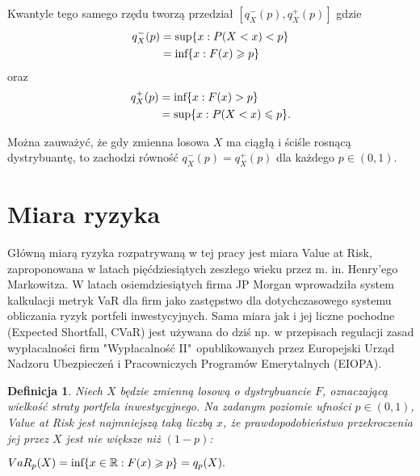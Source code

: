 \documentclass[12pt,a4paper,openany]{book}
\newtheorem{df}{Definicja}
\begin{document}
\noindent Kwantyle tego samego rzędu tworzą przedział $[q^{-}_{X}(p),q^{+}_{X}(p)]$ gdzie
\begin{gather}
\begin{split}
q^{-}_{X}(p) &=\textnormal{sup}\{x: P(X<x)<p\} \\ \nonumber
								 &=\textnormal{inf} \{x: F(x)\geqslant p \} \nonumber
\end{split}
\end{gather}
oraz\
\begin{gather}
\begin{split}
q^{+}_{X}(p) &=\textnormal{inf}\{x: F(x)>p\} \\ \nonumber
								 &=\textnormal{sup} \{x:  P(X<x) \leqslant p \}. \nonumber
\end{split}
\end{gather}

Można zauważyć, że gdy zmienna losowa $X$ ma ciągłą i ściśle rosnącą dystrybuantę, to zachodzi równość $q^{-}_{X}(p) = q^{+}_{X}(p)$ dla każdego $p \in (0,1)$.\\


\section{Miara ryzyka}

Główną miarą ryzyka rozpatrywaną w tej pracy jest miara Value at Risk, zaproponowana w latach pięćdziesiątych zeszłego wieku przez m. in. Henry'ego Markowitza. W latach osiemdziesiątych firma JP Morgan wprowadziła system kalkulacji metryk VaR dla firm jako zastępstwo dla dotychczasowego systemu obliczania ryzyk portfeli inwestycyjnych. Sama miara jak i jej liczne pochodne (Expected Shortfall, CVaR) jest używana do dziś np. w przepisach regulacji zasad wypłacalności firm "Wypłacalność II"$\phantom{c}$opublikowanych przez Europejski Urząd Nadzoru Ubezpieczeń i Pracowniczych Programów Emerytalnych (EIOPA).


\begin{df}
Niech $X$ będzie zmienną losową o dystrybuancie $F$, oznaczającą wielkość straty portfela inwestycyjnego. Na zadanym poziomie ufności $p \in (0,1)$, Value at Risk jest najmniejszą taką liczbą $x$, że prawdopodobieństwo przekroczenia jej przez $X$ jest nie większe niż $(1-p)$:

\begin{center}
$VaR_{p}(X) = \textnormal{inf} \{x \in \mathbb{R}: F(x)\geqslant p \} = q_{p}(X).$
\end{center}
\end{df}
\end{document}
